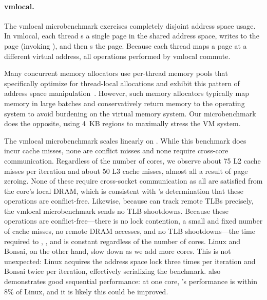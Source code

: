 \begin{figure*}
  \centering
    
    \label{fig:vm-tput:local}
    \hspace{-.25in}
    
    \label{fig:vm-tput:pipeline}
    \hspace{-.25in}
    
    \label{fig:vm-tput:global}
    \addtocounter{figure}{-1}
  \label{fig:vm-tput}
\end{figure*}

\paragraph{vmlocal.} The vmlocal microbenchmark exercises completely
disjoint address space usage.
%
In vmlocal, each thread s a single page in the shared
address space, writes to the page (invoking ), and
then s the page.
%
Because each thread maps a page at a different virtual address, all
operations performed by vmlocal commute.

Many concurrent memory allocators use per-thread memory pools that
specifically optimize for thread-local allocations and exhibit this
pattern of address space manipulation~\cite{jemalloc,tcmalloc}.
However, such memory allocators typically map memory in large batches
and conservatively return memory to the operating system to avoid
burdening on the virtual memory system.
%
Our microbenchmark does the opposite, using 4~KB regions to maximally
stress the VM system.

The vmlocal microbenchmark scales linearly on \sys.
%
While this benchmark does incur cache misses, none are conflict misses
and none require cross-core communication.
%
Regardless of the number of cores, we observe about 75 L2 cache misses
per iteration and about 50 L3 cache misses, almost all a result of
page zeroing.
%
None of these require cross-socket communication as all are satisfied
from the core's local DRAM, which is consistent with \tool's
determination that these operations are conflict-free.
%
Likewise, because \sys can track remote TLBs precisely, the vmlocal
microbenchmark sends no TLB shootdowns.
%
Because these operations are conflict-free---there is no lock
contention, a small and fixed number of cache misses, no remote DRAM
accesses, and no TLB shootdowns---the time required to ,
, and  is constant regardless of the
number of cores.
%
Linux and Bonsai, on the other hand, slow down as we add more cores.
%
This is not unexpected: Linux acquires the address space lock three
times per iteration and Bonsai twice per iteration, effectively
serializing the benchmark.
%
\sys also demonstrates good sequential performance: at one core,
\sys's performance is within 8\% of Linux, and it is likely this could
be improved.

